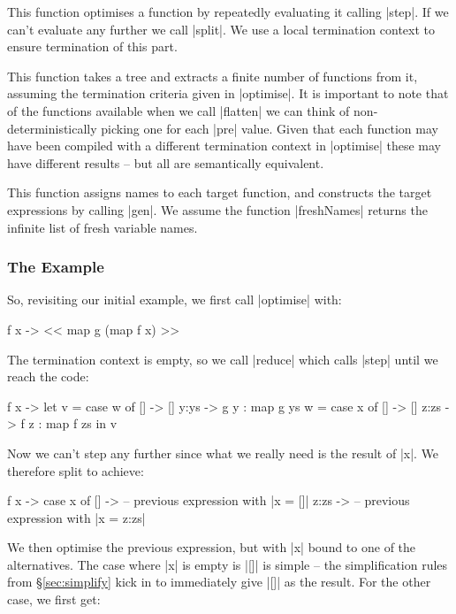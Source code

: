\documentclass{sigplanconf}
\begin{document}
 This function optimises a function by repeatedly evaluating it calling |step|. If we can't evaluate any further we call |split|. We use a local termination context to ensure termination of this part.

 This function takes a tree and extracts a finite number of functions from it, assuming the termination criteria given in |optimise|. It is important to note that of the functions available when we call |flatten| we can think of non-deterministically picking one for each |pre| value. Given that each function may have been compiled with a different termination context in |optimise| these may have different results -- but all are semantically equivalent.

 This function assigns names to each target function, and constructs the target expressions by calling |gen|. We assume the function |freshNames| returns the infinite list of fresh variable names.

\subsubsection{The Example}

So, revisiting our initial example, we first call |optimise| with:

\begin{code}
\g f x -> << map g (map f x) >>
\end{code}

The termination context is empty, so we call |reduce| which calls |step| until we reach the code:

\begin{code}
\g f x ->  let  v = case  w of
                          [] -> []
                          y:ys -> g y : map g ys
                w = case  x of
                          [] -> []
                          z:zs -> f z : map f zs
           in   v
\end{code}

Now we can't step any further since what we really need is the result of |x|. We therefore split to achieve:

\begin{code}
\g f x ->  case  x of
                 [] -> -- previous expression with |x = []|
                 z:zs -> -- previous expression with |x = z:zs|
\end{code}

We then optimise the previous expression, but with |x| bound to one of the alternatives. The case where |x| is empty is |[]| is simple -- the simplification rules from \S\ref{sec:simplify} kick in to immediately give |[]| as the result. For the other case, we first get:
\end{document}
